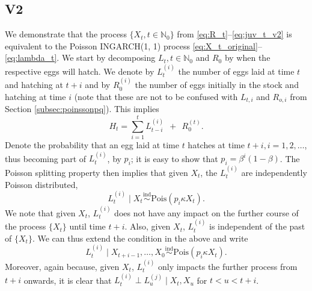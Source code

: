 \documentclass{article}
\begin{document}
\subsection{V2}

We demonstrate that the process $\{X_t, t \in \mathbb{N}_0\}$ from \eqref{eq:R_t}--\eqref{eq:juv_t_v2} is equivalent to the Poisson INGARCH(1, 1) process \eqref{eq:X_t_original}--\eqref{eq:lambda_t}. We start by decomposing $L_t, t \in \mathbb{N}_0$ and $R_0$ by when the respective eggs will hatch. We denote by $L_t^{(i)}$ the number of eggs laid at time $t$ and hatching at $t + i$ and by $R^{(i)}_0$ the number of eggs initially in the stock and hatching at time $i$ (note that these are not to be confused with $L_{t, i}$ and $R_{o, i}$ from Section \ref{subsec:poinssonpq}). This implies
\begin{equation}
H_t = \sum_{i = 1}^{t} L_{t - i}^{(i)} \ \ + \ \ R_0^{(t)}.
\label{eq:sums}
\end{equation}
Denote the probability that an egg laid at time $t$ hatches at time $t + i, i = 1, 2, \dots$, thus becoming part of $L_t^{(i)}$, by $p_i$; it is easy to show that $p_i = \beta^i(1 - \beta)$. The Poisson splitting property \cite{Kingman1993} then implies that given $X_t$, the $L_t^{(i)}$ are independently Poisson distributed,
$$
L_t^{(i)} \mid X_t \stackrel{\text{ind}}{\sim} \text{Pois}(p_i\kappa X_t). %
$$
We note that given $X_t$, $L_t^{(i)}$ does not have any impact on the further course of the process $\{X_t\}$ until time $t + i$. Also, given $X_t$, $L_t^{(i)}$ is independent of the past of $\{X_t\}$. We can thus extend the condition in the above and write
$$
L_t^{(i)} \mid X_{t + i - 1}, \dots, X_0 \stackrel{\text{ind}}{\sim} \text{Pois}(p_i\kappa X_t). %
$$
Moreover, again because, given $X_t$, $L_t^{(i)}$ only impacts the further process from $t + i$ onwards, it is clear that $L_t^{(i)} \perp L_u^{(j)} \mid X_t, X_u$ for $t < u < t + i$.
\end{document}
